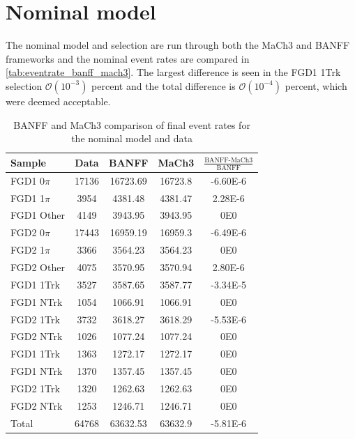 \section{Nominal model}
The nominal model and selection are run through both the MaCh3 and BANFF frameworks and the nominal event rates are compared in \autoref{tab:eventrate_banff_mach3}. The largest difference is seen in the FGD1 1Trk selection $\mathcal{O}(10^{-3})$ percent and the total difference is $\mathcal{O}(10^{-4})$ percent, which were deemed acceptable.
\begin{table}[h]
	\centering
	\begin{tabular}{ l | c c c c }
		\hline 
		\hline 
		Sample & Data  & BANFF & MaCh3 & $\frac{\text{BANFF-MaCh3}}{\text{BANFF}}$ \\ 
		\hline
		FGD1 0$\pi$ &  17136 &  16723.69 & 16723.8 & -6.60E-6 \\
		FGD1 1$\pi$ &  3954 &  4381.48 & 4381.47 & 2.28E-6\\ 
		FGD1 Other &  4149 &  3943.95 & 3943.95 & 0E0\\ 
		\hline
		FGD2 0$\pi$ &  17443 &  16959.19 & 16959.3 & -6.49E-6 \\
		FGD2 1$\pi$ &  3366 &  3564.23 & 3564.23 & 0E0\\
		FGD2 Other &  4075 &  3570.95 & 3570.94 & 2.80E-6 \\
		\hline
		FGD1 1Trk &  3527 &  3587.65 & 3587.77 & -3.34E-5\\ 
		FGD1 NTrk &  1054 &  1066.91 & 1066.91 & 0E0\\
		\hline
		FGD2 1Trk &  3732 &  3618.27 & 3618.29 & -5.53E-6 \\
		FGD2 NTrk &  1026 &  1077.24 & 1077.24 & 0E0 \\
		\hline
		FGD1 \numu 1Trk &  1363 &  1272.17 & 1272.17 & 0E0\\
		FGD1 \numu NTrk &  1370 &  1357.45 & 1357.45 & 0E0 \\
		\hline
		FGD2 \numu 1Trk &  1320 &  1262.63 & 1262.63 & 0E0 \\
		FGD2 \numu NTrk &  1253 &  1246.71 & 1246.71 & 0E0 \\
		\hline
		Total &  64768 &  63632.53 & 63632.9 & -5.81E-6 \\
		\hline
		\hline
	\end{tabular}
	\caption{BANFF and MaCh3 comparison of final event rates for the nominal model and data}
	\label{tab:eventrate_banff_mach3}
\end{table}

